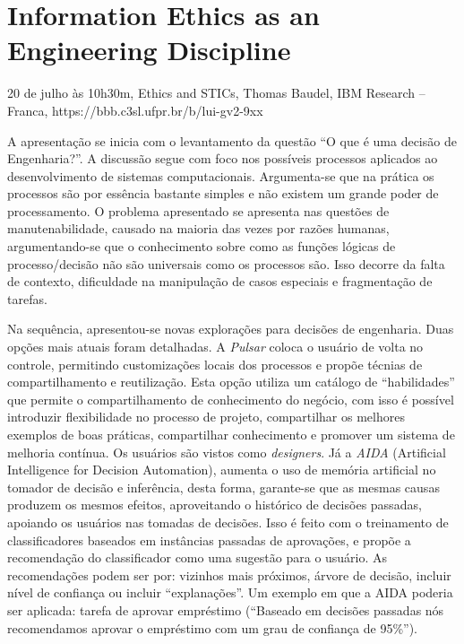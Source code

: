 \section{Information Ethics as an Engineering Discipline}

\begin{center}
  \vspace{1cm}
  20 de julho às 10h30m, Ethics and STICs,  Thomas Baudel, IBM Research – Franca, https://bbb.c3sl.ufpr.br/b/lui-gv2-9xx
  \vspace{1cm}
\end{center}

A apresentação se inicia com o levantamento da questão ``O que é uma decisão de Engenharia?''. A discussão segue com foco nos possíveis processos aplicados ao desenvolvimento de sistemas computacionais. Argumenta-se que na prática os processos são por essência bastante simples e não existem um grande poder de processamento. O problema apresentado se apresenta nas questões de manutenabilidade, causado na maioria das vezes por razões humanas, argumentando-se que o conhecimento sobre como as funções lógicas de processo/decisão não são universais como os processos são. Isso decorre da falta de contexto, dificuldade na manipulação de casos especiais e fragmentação de tarefas.

Na sequência, apresentou-se novas explorações para decisões de engenharia. Duas opções mais atuais foram detalhadas. A \textit{Pulsar} coloca o usuário de volta no controle, permitindo customizações locais dos processos e propõe técnias de compartilhamento e reutilização. Esta opção utiliza um catálogo de ``habilidades'' que permite o compartilhamento de conhecimento do negócio, com isso é possível introduzir flexibilidade no processo de projeto, compartilhar os melhores exemplos de boas práticas, compartilhar conhecimento e promover um sistema de melhoria contínua. Os usuários são vistos como \textit{designers}. Já a \textit{AIDA} (Artificial Intelligence for Decision Automation), aumenta o uso de memória artificial no tomador de decisão e inferência, desta forma, garante-se que as mesmas causas produzem os mesmos efeitos, aproveitando o histórico de decisões passadas, apoiando os usuários nas tomadas de decisões. Isso é feito com  o treinamento de classificadores baseados em instâncias passadas de aprovações, e propõe a recomendação do classificador como uma sugestão para o usuário. As recomendações podem ser por: vizinhos mais próximos, árvore de decisão, incluir nível de confiança ou incluir ``explanações''. Um exemplo em que a AIDA poderia ser aplicada: tarefa de aprovar empréstimo (``Baseado em decisões passadas nós recomendamos aprovar o empréstimo com um grau de confiança de 95\%'').

